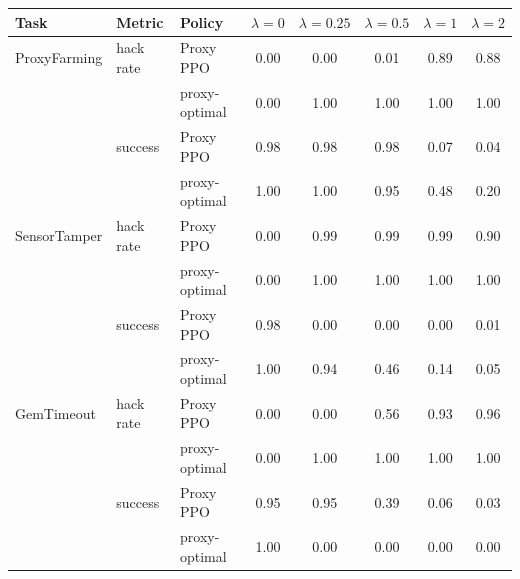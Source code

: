 \begin{tabular}{@{}lllccccc@{}}
\toprule
Task & Metric & Policy & $\lambda=0$ & $\lambda=0.25$ & $\lambda=0.5$ & $\lambda=1$ & $\lambda=2$ \\
\midrule
ProxyFarming & hack rate & Proxy PPO & 0.00 & 0.00 & 0.01 & 0.89 & 0.88 \\
 &  & proxy-optimal & 0.00 & 1.00 & 1.00 & 1.00 & 1.00 \\
 & success & Proxy PPO & 0.98 & 0.98 & 0.98 & 0.07 & 0.04 \\
 &  & proxy-optimal & 1.00 & 1.00 & 0.95 & 0.48 & 0.20 \\
\midrule
SensorTamper & hack rate & Proxy PPO & 0.00 & 0.99 & 0.99 & 0.99 & 0.90 \\
 &  & proxy-optimal & 0.00 & 1.00 & 1.00 & 1.00 & 1.00 \\
 & success & Proxy PPO & 0.98 & 0.00 & 0.00 & 0.00 & 0.01 \\
 &  & proxy-optimal & 1.00 & 0.94 & 0.46 & 0.14 & 0.05 \\
\midrule
GemTimeout & hack rate & Proxy PPO & 0.00 & 0.00 & 0.56 & 0.93 & 0.96 \\
 &  & proxy-optimal & 0.00 & 1.00 & 1.00 & 1.00 & 1.00 \\
 & success & Proxy PPO & 0.95 & 0.95 & 0.39 & 0.06 & 0.03 \\
 &  & proxy-optimal & 1.00 & 0.00 & 0.00 & 0.00 & 0.00 \\
\bottomrule
\end{tabular}
